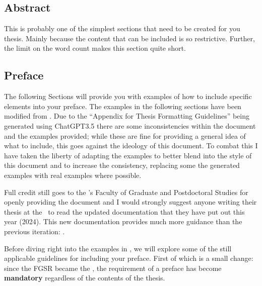 
		\subsection{Abstract}\label{abstract}
			This is probably one of the simplest sections that need to be created for you thesis.
			Mainly because the content that can be included is so restrictive.
			Further, the limit on the word count makes this section quite short.


		\subsection{Preface}\label{preface}
			The following Sections will provide you with examples of how to include specific elements into your preface.
			The examples in the following sections have been modified from .
			Due to the ``Appendix for Thesis Formatting Guidelines'' being generated using ChatGPT3.5 there are some inconsistencies within the document and the examples provided; while these are fine for providing a general idea of what to include, this goes against the ideology of this document.
			To combat this I have taken the liberty of adapting the examples to better blend into the style of this document and to increase the consistency, replacing some the generated examples with real examples where possible.

			Full credit still goes to the \University's Faculty of Graduate and Postdoctoral Studies for openly providing the document and I would strongly suggest anyone writing their thesis at the \University\ to read the updated documentation that they have put out this year (2024).
			This new documentation provides much more guidance than the previous iteration: .

			Before diving right into the examples in , we will explore some of the still applicable guidelines for including your preface. First of which is a small change: since the FGSR became the \Fac, the requirement of a preface has become \textbf{mandatory} regardless of the contents of the thesis.

